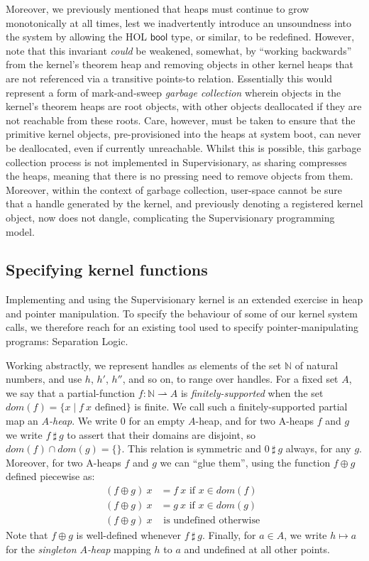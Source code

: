 \documentclass[a4paper, UKenglish, cleveref, autoref, thm-restate, colorlinks]{lipics-v2021}
\begin{document}
Moreover, we previously mentioned that heaps must continue to grow monotonically at all times, lest we inadvertently introduce an unsoundness into the system by allowing the HOL $\mathsf{bool}$ type, or similar, to be redefined.
However, note that this invariant \emph{could} be weakened, somewhat, by ``working backwards'' from the kernel's theorem heap and removing objects in other kernel heaps that are not referenced via a transitive points-to relation.
Essentially this would represent a form of mark-and-sweep \emph{garbage collection} wherein objects in the kernel's theorem heaps are root objects, with other objects deallocated if they are not reachable from these roots.
Care, however, must be taken to ensure that the primitive kernel objects, pre-provisioned into the heaps at system boot, can never be deallocated, even if currently unreachable.
Whilst this is possible, this garbage collection process is not implemented in Supervisionary, as sharing compresses the heaps, meaning that there is no pressing need to remove objects from them.
Moreover, within the context of garbage collection, user-space cannot be sure that a handle generated by the kernel, and previously denoting a registered kernel object, now does not dangle, complicating the Supervisionary programming model.

\subsection{Specifying kernel functions}
\label{subsect.specifying.kernel.functions}

Implementing and using the Supervisionary kernel is an extended exercise in heap and pointer manipulation.
To specify the behaviour of some of our kernel system calls, we therefore reach for an existing tool used to specify pointer-manipulating programs: Separation Logic.

Working abstractly, we represent handles as elements of the set $\mathbb{N}$ of natural numbers, and use $h$, $h'$, $h''$, and so on, to range over handles.
For a fixed set $A$, we say that a partial-function $f : \mathbb{N} \rightharpoonup A$ is \emph{finitely-supported} when the set $dom(f) = \{ x \mid f\ x \text{ defined} \}$ is finite.
We call such a finitely-supported partial map an \emph{$A$-heap}.
We write $0$ for an empty $A$-heap, and for two A-heaps $f$ and $g$ we write $f\ \sharp\ g$ to assert that their domains are disjoint, so $dom(f) \cap dom(g) = \{ \}$.
This relation is symmetric and $0\ \sharp\ g$ always, for any $g$.
Moreover, for two A-heaps $f$ and $g$ we can ``glue them'', using the function $f \oplus g$ defined piecewise as:
\begin{align*}
(f \oplus g)\ x & = f\ x \text{ if $x \in dom(f)$ } \\
(f \oplus g)\ x & = g\ x \text{ if $x \in dom(g)$ } \\
(f \oplus g)\ x & \text{ is undefined otherwise }
\end{align*}
Note that $f \oplus g$ is well-defined whenever $f\ \sharp\ g$.
Finally, for $a \in A$, we write $h \mapsto a$ for the \emph{singleton $A$-heap} mapping $h$ to $a$ and undefined at all other points.
\end{document}
